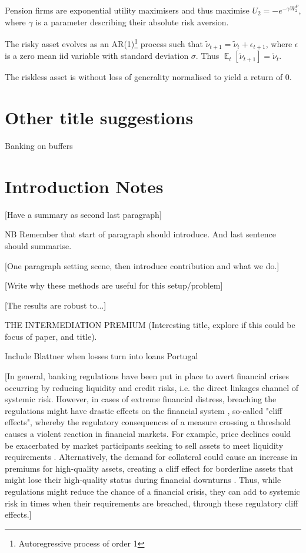 \documentclass[11pt]{article}
\DeclareMathOperator{\E}{\mathbb{E}} %
\begin{document}
\begin{appendices}
Pension firms are exponential utility maximisers and thus maximise
 $U_2 = -e^{-\gamma W_2^P}$, where $\gamma$ is a parameter describing their absolute risk aversion.

The risky asset evolves as an AR(1)\footnote{Autoregressive process of order 1} process such that $\tilde{\nu}_{t+1} = \tilde{\nu}_t + \epsilon_{t+1}$, where $\epsilon$ is a zero mean iid variable with standard deviation $\sigma$. Thus $\E_t[\tilde{\nu}_{t+1}] = \tilde{\nu}_t$.

The riskless asset is without loss of generality normalised to yield a return of 0.

\section{Other title suggestions}
Banking on buffers

\section{Introduction Notes}


[Have a summary as second last paragraph]

NB Remember that start of paragraph should introduce. And last sentence should summarise.

[One paragraph setting scene, then introduce contribution and what we do.]


[Write why these methods are useful for this setup/problem]
	
[The results are robust to...]

THE INTERMEDIATION PREMIUM (Interesting title, explore if this could be focus of paper, and title).

Include Blattner when losses turn into loans Portugal

[In general, banking regulations have been put in place to avert financial crises occurring by reducing liquidity and credit risks, i.e. the direct linkages channel of systemic risk. However, in cases of extreme financial distress, breaching the regulations might have drastic effects on the financial system \citep{CruzLopez2013}, so-called "cliff effects", whereby the regulatory consequences of a measure crossing a threshold causes a violent reaction in financial markets.  For example, price declines could be exacerbated by market participants seeking to sell assets to meet liquidity requirements \citep{Gorton2009}. Alternatively, the demand for collateral could cause an increase in premiums for high-quality assets, creating a cliff effect for borderline assets that might lose their high-quality status during financial downturns \citep{IMF2012}. Thus, while regulations might reduce the chance of a financial crisis, they can add to systemic risk in times when their requirements are breached, through these regulatory cliff effects.]


\end{appendices}
\end{document}
